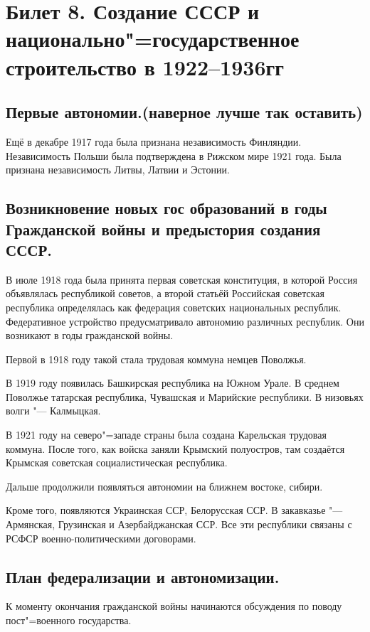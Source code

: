 \section{Билет 8. Создание СССР и национально"=государственное строительство в 1922--1936гг}

\subsection{Первые автономии.(наверное лучше так оставить)}

Ещё в декабре 1917 года была признана независимость Финляндии. Независимость Польши была подтверждена в Рижском мире 1921 года. Была признана независимость Литвы, Латвии и Эстонии.

\subsection{Возникновение новых гос образований в годы Гражданской войны и предыстория создания СССР.}

В июле 1918 года была принята первая советская конституция, в которой Россия объявлялась республикой советов, а второй статьёй Российская советская республика определялась как федерация советских национальных республик. Федеративное устройство предусматривало автономию различных республик. Они возникают в годы гражданской войны.

Первой в 1918 году такой стала трудовая коммуна немцев Поволжья.

В 1919 году появилась Башкирская республика на Южном Урале. В среднем Поволжье татарская республика, Чувашская и Марийские республики. В низовьях волги "--- Калмыцкая.

В 1921 году на северо"=западе страны была создана Карельская трудовая коммуна. После того, как войска заняли Крымский полуостров, там создаётся Крымская советская социалистическая республика. 

Дальше продолжили появляться автономии на ближнем востоке, сибири.

Кроме того, появляются Украинская ССР, Белорусская ССР. В закавказье "--- Армянская, Грузинская и Азербайджанская ССР. Все эти республики связаны с РСФСР военно-политическими договорами.

\subsection{План федерализации и автономизации.}

К моменту окончания гражданской войны начинаются обсуждения по поводу пост"=военного государства. 

